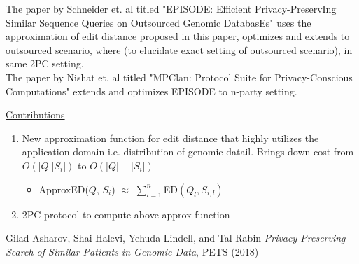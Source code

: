 The paper by Schneider et. al titled "EPISODE: Efficient Privacy-PreservIng Similar Sequence Queries on Outsourced Genomic DatabasEs" uses the approximation of edit distance proposed in this paper, optimizes and extends to outsourced scenario, where (to elucidate exact setting of outsourced scenario), in same 2PC setting. \\

The paper by Nishat et. al titled "MPClan: Protocol Suite for Privacy-Conscious Computations" extends and optimizes EPISODE to n-party setting.

\underline{Contributions}
\begin{enumerate}
   \item New approximation function for edit distance that highly utilizes the application domain i.e. distribution of genomic datail. Brings down cost from $O(|Q||S_i|)$ to $O(|Q|+|S_i|)$ 
    \begin{itemize}
        \item ApproxED($Q$, $S_i$) $\approx$ $\sum_{l=1}^n$ED$(Q_l, S_{i,l})$
    \end{itemize}
    \item 2PC protocol to compute above approx function 
\end{enumerate}

\begin{thebibliography}{99}

 Gilad Asharov, Shai Halevi, Yehuda Lindell, and Tal Rabin \emph{Privacy-Preserving Search of Similar Patients in
Genomic Data}, {PETS} (2018)

\end{thebibliography}

%
